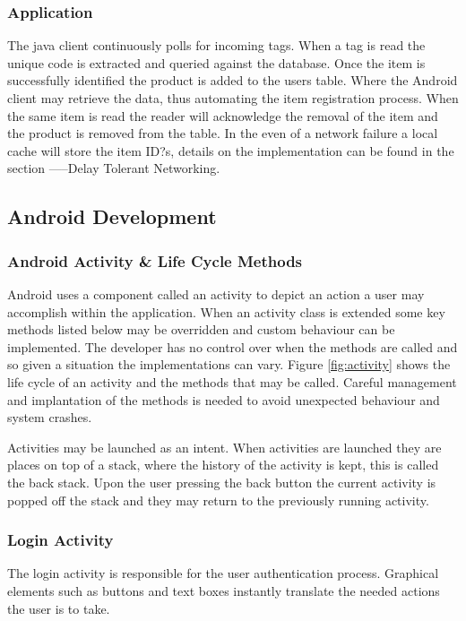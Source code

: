 \documentclass[a4paper, 11pt]{article}
\begin{document}
\subsubsection{Application} 
The java client continuously polls for incoming tags. When a tag is read the unique code is extracted and queried against the database. Once the item is successfully identified the product is added to the users table. Where the Android client may retrieve the data, thus automating the item registration process. When the same item is read the reader will acknowledge the removal of the item and the product is removed from the table.
In the even of a network failure a local cache will store the item ID?s, details on the implementation can be found in the section -----Delay Tolerant Networking. 

\vspace{\baselineskip}
\subsection{Android Development} 

\subsubsection{Android Activity \& Life Cycle Methods}
Android uses a component called an activity to depict an action a user may accomplish within the application. When an activity class is extended some key methods listed below may be overridden and custom behaviour can be implemented. The developer has no control over when the methods are called and so given a situation the implementations can vary. Figure \ref{fig:activity} shows the life cycle of an activity and the methods that may be called. Careful management and implantation of the methods is needed to avoid unexpected behaviour and system crashes.

Activities may be launched as an intent. When activities are launched they are places on top of a stack, where the history of the activity is kept, this is called the back stack. Upon the user pressing the back button the current activity is popped off the stack and they may return to the previously running activity. 


\subsubsection{Login Activity}
The login activity is responsible for the user authentication process. Graphical elements such as buttons and text boxes instantly translate the needed actions the user is to take. 
\end{document}

